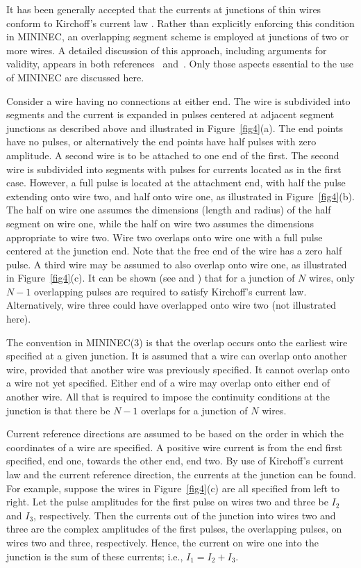 \documentclass[12pt]{article}
\begin{document}
It has been generally accepted that the currents at junctions of thin
wires conform to Kirchoff's current law \cite{r10}. Rather
than explicitly enforcing this condition in MININEC, an overlapping
segment scheme \cite{r11} is employed at junctions of two or
more wires. A detailed discussion of this approach, including arguments
for validity, appears in both references~\cite{r8} and~\cite{r9}. Only
those aspects essential to the use of MININEC are discussed here.

Consider a wire having no connections at either end. The wire is
subdivided into segments and the current is expanded in pulses centered
at adjacent segment junctions as described above and illustrated in
Figure~\ref{fig4}(a). The end points have no pulses, or alternatively the
end points have half pulses with zero amplitude. A second wire is to be
attached to one end of the first. The second wire is subdivided into
segments with pulses for currents located as in the first case. However,
a full pulse is located at the attachment end, with half the pulse
extending onto wire two, and half onto wire one, as illustrated in
Figure~\ref{fig4}(b). The half on wire one assumes the dimensions (length
and radius) of the half segment on wire one, while the half on wire two
assumes the dimensions appropriate to wire two. Wire two overlaps onto
wire one with a full pulse centered at the junction end. Note that the
free end of the wire has a zero half pulse. A third wire may be assumed
to also overlap onto wire one, as illustrated in Figure~\ref{fig4}(c). It can
be shown (see \cite{r8} and \cite{r9}) that for a junction of
$N$ wires, only $N-1$ overlapping pulses are required to satisfy
Kirchoff's current law. Alternatively, wire three could have overlapped
onto wire two (not illustrated here).

The convention in MININEC(3) is that the overlap occurs onto the
earliest wire specified at a given junction. It is assumed that a wire
can overlap onto another wire, provided that another wire was previously
specified. It cannot overlap onto a wire not yet specified. Either end
of a wire may overlap onto either end of another wire. All that is
required to impose the continuity conditions at the junction is that
there be $N-1$ overlaps for a junction of $N$ wires.

Current reference directions are assumed to be based on the order in
which the coordinates of a wire are specified. A positive wire current
is from the end first specified, end one, towards the other end, end
two. By use of Kirchoff's current law and the current reference
direction, the currents at the junction can be found. For example,
suppose the wires in Figure~\ref{fig4}(c) are all specified from left to
right. Let the pulse amplitudes for the first pulse on wires two and
three be $I_2$ and $I_3$, respectively. Then the currents out of the
junction into wires two and three are the complex amplitudes of the
first pulses, the overlapping pulses, on wires two and three,
respectively. Hence, the current on wire one into the junction is the
sum of these currents; i.e., $I_1=I_2+I_3$.
\end{document}
